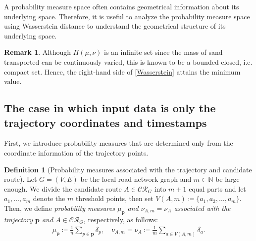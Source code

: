 \documentclass{article}
\numberwithin{equation}{section}
\theoremstyle{definition}
\newtheorem{definition}{Definition}[section]
\newtheorem{remark}[remark]{Remark}
\newcommand{\CR}{\mathcal{CR}}
\newcommand{\N}{\mathbb{N}}
\def\:={\coloneqq} %
\begin{document}
A probability measure space often contains geometrical information about its underlying space.
Therefore, it is useful to analyze the probability measure space using Wasserstein distance to understand the geometrical structure of its underlying space.

\begin{remark}
Although $\Pi(\mu,\nu)$ is an infinite set since the mass of sand transported can be continuously varied, this is known to be a bounded closed, i.e. compact set.
Hence, the right-hand side of \eqref{Wasserstein} attains the minimum value.
\end{remark}

\subsection{The case in which input data is only the trajectory coordinates and timestamps} \label{input:tra&time}



First, we introduce probability measures that are determined only from the coordinate information of the trajectory points.

\begin{definition}[Probability measures associated with the trajectory and candidate route] \label{mupnu}
Let $G=(V,E)$ be the local road network graph and $m\in\N$ be large enough.
We divide the candidate route $A\in\CR_G$ into $m+1$ equal parts and let $a_1, \ldots ,a_m$ denote the $m$ threshold points, then set $V(A,m)\:=\{a_1,a_2,\ldots,a_m\}$.
Then, we define \emph{probability measures $\mu_\mathbf{p}$ and $\nu_{A,m}=\nu_A$ associated with the trajectory $\mathbf{p}$ and $A\in\CR_G$}, respectively, as follows:
\begin{align*}
    \mu_\mathbf{p} \:= \frac{1}{n} \sum_{p\in\mathbf{p}} \delta_p, \quad
    \nu_{A,m} = \nu_A \:= \frac{1}{m} \sum_{a\in V(A,m)} \delta_a.
\end{align*}
\end{definition}
\end{document}
